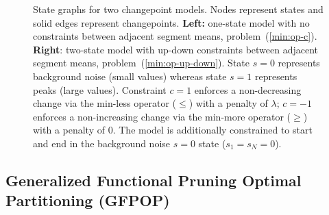 \documentclass[article]{jss}
\begin{document}
\begin{figure}
  \centering
  \begin{minipage}{3in}
    \centering
  \end{minipage}
  \begin{minipage}{3in}
    \centering
  \end{minipage}
  \caption{State graphs for two changepoint models. Nodes represent
    states and solid edges represent changepoints. \textbf{Left:}
    one-state model with no constraints between adjacent segment
    means, problem~(\ref{min:op-c}). \textbf{Right}: two-state model with
    up-down constraints between adjacent segment means,
    problem~(\ref{min:op-up-down}). State $s=0$ represents background
    noise (small values) whereas state $s=1$ represents peaks (large
    values). Constraint $c=1$ enforces a non-decreasing change via the
    min-less operator ($\leq$) with a penalty of $\lambda$; $c=-1$
    enforces a non-increasing change via the min-more operator
    ($\geq$) with a penalty of $0$. The model is additionally
    constrained to start and end in the background noise $s=0$ state
    ($s_1=s_N=0$).}
  \label{fig:state-graph}
\end{figure}

\subsection{Generalized Functional Pruning Optimal Partitioning (GFPOP)}
\end{document}

